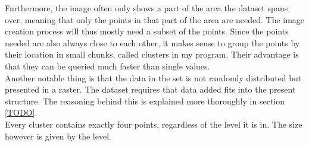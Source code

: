 \documentclass[10pt,a4paper,titlepage]{article}
\begin{document}
	Furthermore, the image often only shows a part of the area the dataset spans over, meaning that only the points in that part of the area are needed. The image creation process will thus mostly need a subset of the points. Since the points needed are also always close to each other, it makes sense to group the points by their location in small chunks, called clusters in my program. Their advantage is that they can be queried much faster than single values.\\	
	Another notable thing is that the data in the set is not randomly distributed but presented in a raster. The dataset requires that data added fits into the present structure. The reasoning behind this is explained more thoroughly in section \ref{TODO}.\\
	Every cluster contains exactly four points, regardless of the level it is in. The size however is given by the level.
\end{document}
